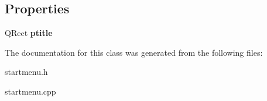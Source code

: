 \subsection*{Properties}
\begin{DoxyCompactItemize}
\item 
\hypertarget{class_start_menu_a60a9b0bf69fd27521cef5c8356474f91}{}Q\+Rect {\bfseries ptitle}\label{class_start_menu_a60a9b0bf69fd27521cef5c8356474f91}

\end{DoxyCompactItemize}


The documentation for this class was generated from the following files\+:\begin{DoxyCompactItemize}
\item 
startmenu.\+h\item 
startmenu.\+cpp\end{DoxyCompactItemize}
